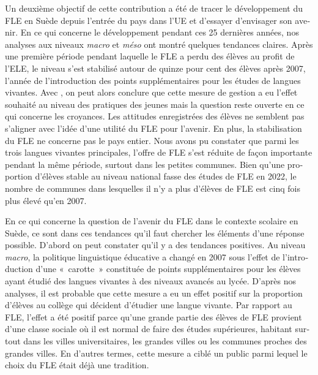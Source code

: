 \documentclass[french, output=paper]{langscibook}
\begin{document}
\begin{otherlanguage}{french}
Un deuxième objectif de cette contribution a été de tracer le développement du FLE en Suède depuis l’entrée du pays dans l’UE et d’essayer d’envisager son avenir. En ce qui concerne le développement pendant ces 25 dernières années, nos analyses aux niveaux \textit{macro} et \textit{méso} ont montré quelques tendances claires. Après une première période pendant laquelle le FLE a perdu des élèves au profit de l’ELE, le niveau s’est stabilisé autour de quinze pour cent des élèves après 2007, l’année de l’introduction des points supplémentaires pour les études de langues vivantes. Avec \citet{Spolsky2004}, on peut alors conclure que cette mesure de gestion a eu l’effet souhaité au niveau des pratiques des jeunes mais la question reste ouverte en ce qui concerne les croyances. Les attitudes enregistrées des élèves ne semblent pas s’aligner avec l’idée d’une utilité du FLE pour l’avenir. En plus, la stabilisation du FLE ne concerne pas le pays entier. Nous avons pu constater que parmi les trois langues vivantes principales, l’offre de FLE s’est réduite de façon importante pendant la même période, surtout dans les petites communes. Bien qu’une proportion d’élèves stable au niveau national fasse des études de FLE en 2022, le nombre de communes dans lesquelles il n’y a plus d’élèves de FLE est cinq fois plus élevé qu’en 2007.

En ce qui concerne la question de l’avenir du FLE dans le contexte scolaire en Suède, ce sont dans ces tendances qu’il faut chercher les éléments d’une réponse possible. D’abord on peut constater qu’il y a des tendances positives. Au niveau \textit{macro}, la politique linguistique éducative a changé en 2007 sous l’effet de l’introduction d’une «~carotte~» constituée de points supplémentaires pour les élèves ayant étudié des langues vivantes à des niveaux avancés au lycée. D’après nos analyses, il est probable que cette mesure a eu un effet positif sur la proportion d’élèves au collège qui décident d’étudier une langue vivante. Par rapport au FLE, l’effet a été positif parce qu’une grande partie des élèves de FLE provient d’une classe sociale où il est normal de faire des études supérieures, habitant surtout dans les villes universitaires, les grandes villes ou les communes proches des grandes villes. En d’autres termes, cette mesure a ciblé un public parmi lequel le choix du FLE était déjà une tradition. 


\end{otherlanguage}
\end{document}
